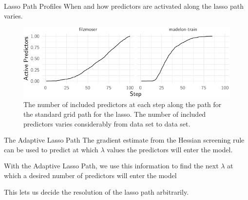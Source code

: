 \begin{frame}{Lasso Path Profiles}
  When and how predictors are activated along the lasso path varies.
  \begin{figure}
    \includegraphics{figures/grid-paths.pdf}
    \caption{The number of included predictors at each step along the path for
    the standard grid path for the lasso. The number of included predictors
  varies considerably from data set to data set.\label{fig:grid-paths}}
  \end{figure}
\end{frame}

\begin{frame}{The Adaptive Lasso Path}
  The gradient estimate from the Hessian screening rule can be used to predict
  at which \(\lambda\) values the predictors will enter the model. \medskip

  With the Adaptive Lasso Path, we use this information to find the next
  \(\lambda\) at which a desired number of predictors will enter the model
  \medskip

  This lets us decide the resolution of the lasso path arbitrarily.
\end{frame}

